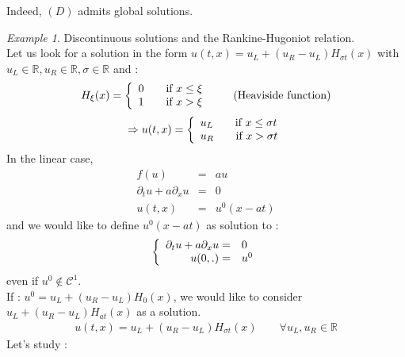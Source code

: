 \documentclass{report}
\theoremstyle{plain}
\theoremstyle{definition}
\theoremstyle{remark}
\newtheorem*{ex}{Example}
\begin{document}
    Indeed, $(D)$ admits global solutions. \\
    \begin{ex}
        Discontinuous solutions and the Rankine-Hugoniot relation.\\
        Let us look for a solution in the form $u(t,x) = u_L + (u_R - u_L)H_{\sigma t}(x)$ with $u_L\in \mathbb{R}, u_R \in \mathbb{R}, \sigma \in \mathbb{R}$ and :
        \begin{equation*}
    	H_\xi(x) =\left\lbrace
    	\begin{array}[]{l}
    		 0 \qquad \text{if } x \le \xi \\
    		 1 \qquad \text{if } x > \xi
    	\end{array}\right.
    	\qquad \text{(Heaviside function)}
        \end{equation*}
        \begin{equation*}
    	\Rightarrow u(t,x) =\left\lbrace
    	\begin{array}[]{l}
    		 u_L \qquad \text{if } x \le \sigma t \\
    		 u_R \qquad \text{if } x > \sigma t
    	\end{array}\right.
        \end{equation*}
        In the linear case, \begin{eqnarray*}
        f(u) &=& au \\
        \partial_t u + a \partial_x u &=& 0 \\
        u(t,x) &=& u^0(x-at)
        \end{eqnarray*}
        and we would like to define $u^0(x-at)$ as solution to :
        \begin{equation*}
    	\left\lbrace
    	\begin{array}[]{rl}
    		 \partial_t u + a \partial_x u =& 0 \\
    		 u(0,.) =& u^0
    	\end{array}\right.
        \end{equation*}
        even if $u^0 \not\in \mathcal{C}^1$.\\ 
        If : $u^0 = u_L + (u_R - u_L) H_0(x)$, we would like to consider $u_L + (u_R - u_L) H_{at}(x)$ as a solution.
        \begin{eqnarray*}
        u(t,x) = u_L + (u_R - u_L) H_{\sigma t}(x) \qquad \forall u_L, u_R \in \mathbb{R}
        \end{eqnarray*}
        Let's study :
        \begin{eqnarray*}

\end{eqnarray*}
\end{ex}
\end{document}
